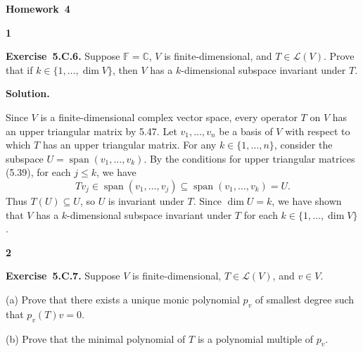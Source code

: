 \documentclass[11pt]{article}
\newcommand{\AssignmentType}{Homework} %
\newcommand{\AssignmentNumber}{4}
\newcommand{\ProblemDivider}[1]{%
  \vspace{1.0em}
  \noindent\textbf{#1}\par
  \vspace{0.35em}
}
\newcommand{\ProblemAnnounce}{\noindent}
\newcommand{\SolutionAnnounce}{\noindent\textbf{Solution.}\par\medskip}
\newcommand{\Exercise}[1]{\textbf{Exercise~#1.}\;}
\newcommand{\C}{\mathbb{C}}
\newcommand{\F}{\mathbb{F}}
\newcommand{\calL}{\mathcal{L}}
\begin{document}
\begin{center}
  {\Large \textbf{\AssignmentType~\AssignmentNumber}}
\end{center}
\vspace{0.75em}

\ProblemDivider{1}

\begin{problemBox}
\ProblemAnnounce
\Exercise{5.C.6}
Suppose $\F = \C$, $V$ is finite-dimensional, and $T \in \calL(V)$. Prove that if
$k \in \{1, \dots, \dim V\}$, then $V$ has a $k$-dimensional subspace invariant under $T$.
\end{problemBox}

\begin{solutionBox}
\SolutionAnnounce
\doublespacing

Since $V$ is a finite-dimensional complex vector space, every operator $T$ on $V$ has an upper triangular matrix by 5.47. Let $v_1, \dots, v_n$ be a basis of $V$ with respect to which $T$ has an upper triangular matrix. For any $k \in \{1, \dots, n\}$, consider the subspace $U = \operatorname{span}(v_1, \dots, v_k)$. By the conditions for upper triangular matrices (5.39), for each $j \leq k$, we have
\[
Tv_j \in \operatorname{span}(v_1, \dots, v_j) \subseteq \operatorname{span}(v_1, \dots, v_k) = U.
\]
Thus $T(U) \subseteq U$, so $U$ is invariant under $T$. Since $\dim U = k$, we have shown that $V$ has a $k$-dimensional subspace invariant under $T$ for each $k \in \{1, \dots, \dim V\}$.

\end{solutionBox}

\ProblemDivider{2}

\begin{problemBox}
\ProblemAnnounce
\Exercise{5.C.7}
Suppose $V$ is finite-dimensional, $T \in \calL(V)$, and $v \in V$.

(a) Prove that there exists a unique monic polynomial $p_v$ of smallest degree such that $p_v(T)v = 0$.

(b) Prove that the minimal polynomial of $T$ is a polynomial multiple of $p_v$.
\end{problemBox}
\end{document}
